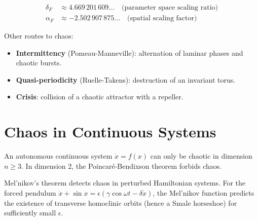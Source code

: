 \begin{keyformulas}[title=\textbf{Feigenbaum Constants}]
\begin{align*}
    \delta_F &\approx 4.669\,201\,609\ldots
    \quad \text{(parameter space scaling ratio)} \\
    \alpha_F &\approx -2.502\,907\,875\ldots
    \quad \text{(spatial scaling factor)}
\end{align*}
\end{keyformulas}

Other routes to chaos:
\begin{itemize}
    \item \textbf{Intermittency} (Pomeau-Manneville): alternation of laminar
    phases and chaotic bursts.
    \item \textbf{Quasi-periodicity} (Ruelle-Takens): destruction of an
    invariant torus.
    \item \textbf{Crisis}: collision of a chaotic attractor with a repeller.
\end{itemize}

\section{Chaos in Continuous Systems}

\begin{attention}[title=\textbf{Minimum dimension for continuous chaos}]
An autonomous continuous system $\dot{x} = f(x)$ can only be chaotic in
dimension $n \geq 3$. In dimension 2, the Poincar\'e-Bendixson theorem
forbids chaos.
\end{attention}

\begin{example}
Mel'nikov's theorem detects chaos in perturbed Hamiltonian systems. For the
forced pendulum $\ddot{x} + \sin x = \epsilon(\gamma\cos\omega t - \delta\dot{x})$,
the Mel'nikov function predicts the existence of transverse homoclinic orbits
(hence a Smale horseshoe) for sufficiently small $\epsilon$.
\end{example}

